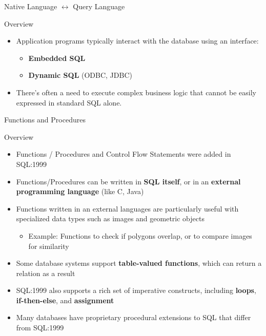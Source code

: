 \documentclass[aspectratio=169, xcolor=dvipsnames]{beamer}
\begin{document}
\begin{frame}{Native Language $\leftrightarrow$ Query Language}
    \begin{block}{Overview}
        \begin{itemize}[<+->]
            \item Application programs typically interact with the database using an interface:
            \begin{itemize}
                \item[$\triangleright$] \textbf{Embedded SQL}
                \item[$\triangleright$] \textbf{Dynamic SQL} (ODBC, JDBC)
            \end{itemize}
            \item There's often a need to execute complex business logic that cannot be easily expressed in standard SQL alone.
        \end{itemize}
    \end{block}
\end{frame}

\begin{frame}{Functions and Procedures}
    \begin{block}{Overview}
        \begin{itemize}[<+->]
            \item Functions / Procedures and Control Flow Statements were added in SQL:1999
            \item Functions/Procedures can be written in \textbf{SQL itself}, or in an \textbf{external programming language} (like C, Java)
            \item Functions written in an external languages are particularly useful with specialized data types such as images and geometric objects
            \begin{itemize}
                \item[$\triangleright$] Example: Functions to check if polygons overlap, or to compare images for similarity
            \end{itemize}
            \item Some database systems support \textbf{table-valued functions}, which can return a relation as a result
            \item SQL:1999 also supports a rich set of imperative constructs, including \textbf{loops}, \textbf{if-then-else}, and \textbf{assignment}
            \item Many databases have proprietary procedural extensions to SQL that differ from SQL:1999
        \end{itemize}
    \end{block}
\end{frame}
\end{document}
